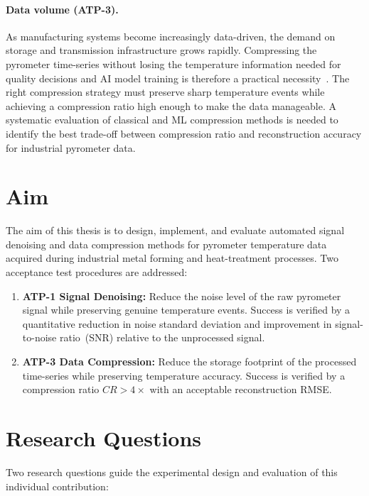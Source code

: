 \paragraph{Data volume (ATP-3).}
As manufacturing systems become increasingly data-driven, the demand on storage and transmission infrastructure grows rapidly. Compressing the pyrometer time-series without losing the temperature information needed for quality decisions and AI model training is therefore a practical necessity~\cite{autoencoder_compression, lossless_compression}. The right compression strategy must preserve sharp temperature events while achieving a compression ratio high enough to make the data manageable. A systematic evaluation of classical and ML compression methods is needed to identify the best trade-off between compression ratio and reconstruction accuracy for industrial pyrometer data.

\section{Aim}
\label{sec:aim}

The aim of this thesis is to design, implement, and evaluate automated signal denoising and data compression methods for pyrometer temperature data acquired during industrial metal forming and heat-treatment processes. Two acceptance test procedures are addressed:

\begin{enumerate}[leftmargin=2em]
\item \textbf{ATP-1 Signal Denoising:} Reduce the noise level of the raw pyrometer signal while preserving genuine temperature events. Success is verified by a quantitative reduction in noise standard deviation and improvement in signal-to-noise ratio~(SNR) relative to the unprocessed signal.

\item \textbf{ATP-3 Data Compression:} Reduce the storage footprint of the processed time-series while preserving temperature accuracy. Success is verified by a compression ratio $CR > 4\times$ with an acceptable reconstruction RMSE.
\end{enumerate}

\section{Research Questions}
\label{sec:research-questions}

Two research questions guide the experimental design and evaluation of this individual contribution:

